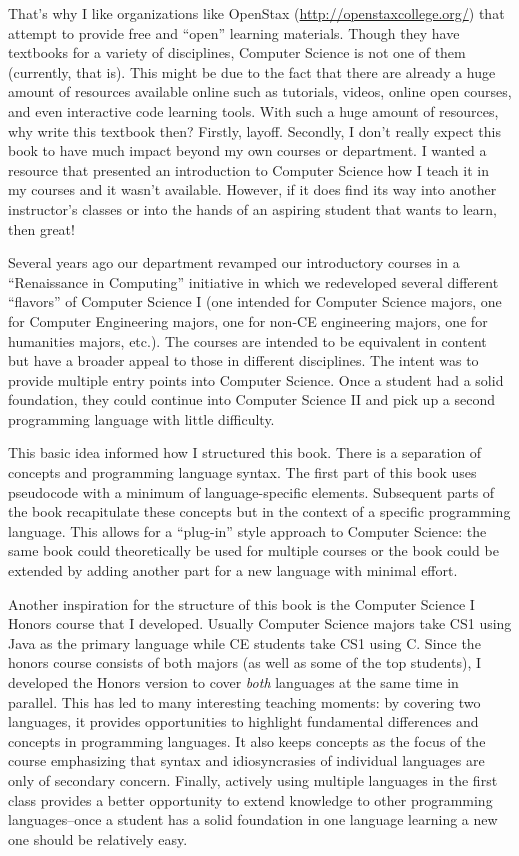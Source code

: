 That's why I like organizations like OpenStax (\url{http://openstaxcollege.org/}) that attempt to provide 
free and ``open'' learning materials.  Though they have textbooks for a variety of disciplines, Computer
Science is not one of them (currently, that is).  This might be due to the fact that there are already a 
huge amount of resources available online such as tutorials, videos, online open courses, and even
interactive code learning tools.  With such a huge amount of resources, why write this textbook then?  
Firstly, layoff.  Secondly, I don't really expect this book to have much impact beyond my own courses or
department.  I wanted a resource that presented an introduction to Computer Science how I teach it in my courses and
it wasn't available.  However, if it does find its way into another instructor's classes or into the hands
of an aspiring student that wants to learn, then great!

Several years ago our department revamped our introductory courses in a ``Renaissance in Computing''
initiative in which we redeveloped several different ``flavors'' of Computer Science I (one intended for
Computer Science majors, one for Computer Engineering majors, one for non-CE engineering majors, 
one for humanities majors, etc.).  The courses are intended to be equivalent in content but have a 
broader appeal to those in different disciplines.  The intent was to provide multiple entry points into
Computer Science.  Once a student had a solid foundation, they could continue into Computer Science
II and pick up a second programming language with little difficulty.  

This basic idea informed how I structured this book.  There is a separation of concepts and 
programming language syntax.  The first part of this book uses pseudocode with a 
minimum of language-specific elements.  Subsequent parts of the book recapitulate these concepts
but in the context of a specific programming language.  This allows for a ``plug-in'' style approach
to Computer Science: the same book could theoretically be used for multiple courses or the
book could be extended by adding another part for a new language with minimal effort.

Another inspiration for the structure of this book is the Computer Science I Honors course that
I developed.  Usually Computer Science majors take CS1 using Java as the primary language
while CE students take CS1 using C.  Since the honors course consists of both majors (as well
as some of the top students), I developed the Honors version to cover \emph{both} languages
at the same time in parallel.  This has led to many interesting teaching moments: by covering
two languages, it provides opportunities to highlight fundamental differences and concepts
in programming languages.  It also keeps concepts as the focus of the course emphasizing
that syntax and idiosyncrasies of individual languages are only of secondary concern.  Finally, 
actively using multiple languages in the first class provides a better opportunity to extend 
knowledge to other programming languages--once a student has a solid foundation in one
language learning a new one should be relatively easy.  

